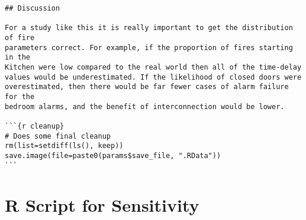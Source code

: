 \begin{lstlisting}[basicstyle=\scriptsize]
## Discussion

For a study like this it is really important to get the distribution of fire
parameters correct. For example, if the proportion of fires starting in the
Kitchen were low compared to the real world then all of the time-delay
values would be underestimated. If the likelihood of closed doors were
overestimated, then there would be far fewer cases of alarm failure for the
bedroom alarms, and the benefit of interconnection would be lower.

```{r cleanup}
# Does some final cleanup
rm(list=setdiff(ls(), keep))
save.image(file=paste0(params$save_file, ".RData"))
```
\end{lstlisting}

\section{R Script for Sensitivity}
\label{rscript-sensitivity}
\vspace{\baselineskip}
